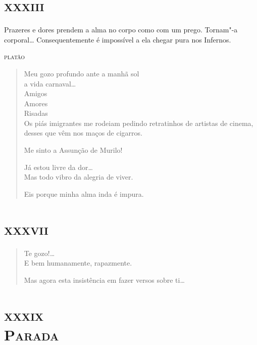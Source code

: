 \chapter[\textsc{xxxiii} -- ``Meu gozo profundo ante a manhã sol'']{\textsc{xxxiii}}

\epigraph{Prazeres e dores prendem a alma no corpo como com um prego. Tornam"-a
corporal\ldots{} Consequentemente é impossível a ela chegar pura nos
Infernos.}{\textsc{platão}}

\begin{verse}
Meu gozo profundo ante a manhã sol\\
\quad\quad\quad\quad{}a vida carnaval\ldots{}\\
\quad\quad\quad{}Amigos\\
\quad\quad{}Amores\\
\quad{}Risadas\\
Os piás imigrantes me rodeiam pedindo retratinhos de artistas de cinema,
desses que vêm nos maços de cigarros.

Me sinto a Assunção de Murilo!

Já estou livre da dor\ldots{}\\
Mas todo vibro da alegria de viver.

\quad{}Eis porque minha alma inda é impura.
\end{verse}

\chapter[\textsc{xxxvii} -- ``Te gozo!\ldots{}'']{\textsc{xxxvii}}

\begin{verse}
Te gozo!\ldots{}\\
E bem humanamente, rapazmente.

Mas agora esta insistência em fazer versos sobre ti\ldots{}
\end{verse}

\chapter[\textsc{xxxix} -- \textsc{Parada}]{\textsc{xxxix}\\\textsc{Parada} }

